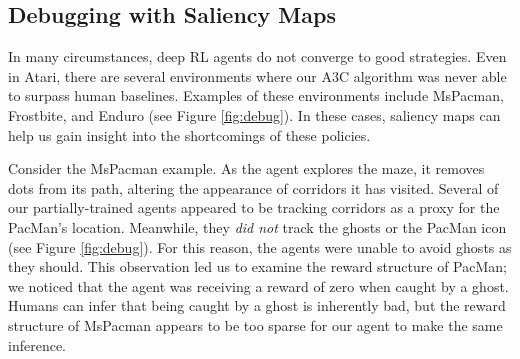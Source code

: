 \documentclass{article}
\begin{document}
\begin{centering}
\begin{figure*}[h!]
\centering
{} \hspace{0.2cm}
 \hspace{0.2cm}

\caption{These agents do not attain human performance in the three Atari environments shown. We display the policy saliency in green here because it is easier to see against blue backgrounds. We omit the critic saliency. (a) In MsPacman, the agent should avoid the ghosts. Our agent is not tracking the red ghost, circled. (b) In Frostbite, the agent leaps between platforms. Our agent should attend to its destination platform, circled. Rather, it attends to the goal location at the top of the screen. (c) In Enduro, the agent should avoid other racers. Our agent should be tracking the blue racer, circled. Rather, it focuses on the distant mountains, presumably as a navigation anchor.}
\label{fig:debug}
\end{figure*}
\end{centering}

\subsection{Debugging with Saliency Maps}

In many circumstances, deep RL agents do not converge to good strategies. Even in Atari, there are several environments where our A3C algorithm was never able to surpass human baselines. Examples of these environments include MsPacman, Frostbite, and Enduro (see Figure \ref{fig:debug}). In these cases, saliency maps can help us gain insight into the shortcomings of these policies.

Consider the MsPacman example. As the agent explores the maze, it removes dots from its path, altering the appearance of corridors it has visited. Several of our partially-trained agents appeared to be tracking corridors as a proxy for the PacMan's location. Meanwhile, they \textit{did not} track the ghosts or the PacMan icon (see Figure \ref{fig:debug}). For this reason, the agents were unable to avoid ghosts as they should. This observation led us to examine the reward structure of PacMan; we noticed that the agent was receiving a reward of zero when caught by a ghost. Humans can infer that being caught by a ghost is inherently bad, but the reward structure of MsPacman appears to be too sparse for our agent to make the same inference.
\end{document}
